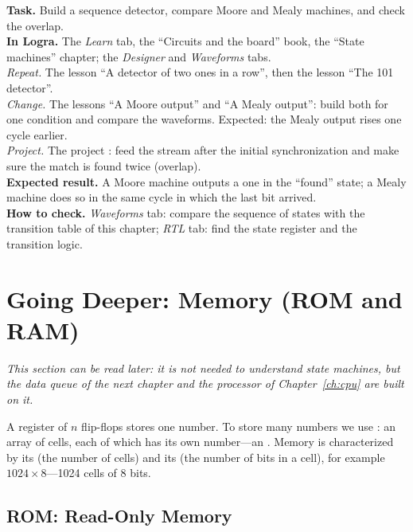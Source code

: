 \begin{diybox}
\textbf{Task.} Build a sequence detector, compare Moore and Mealy machines,
and check the overlap.\\
\textbf{In Logra.} The \emph{Learn} tab, the ``Circuits and the board'' book,
the ``State machines'' chapter; the \emph{Designer} and \emph{Waveforms}
tabs.\\
 \emph{Repeat.} The lesson ``A detector of two ones in a row'', then
the lesson ``The 101 detector''.\\
 \emph{Change.} The lessons ``A Moore output'' and ``A Mealy output'':
build both for one condition and compare the waveforms. Expected: the Mealy
output rises one cycle earlier.\\
 \emph{Project.} The project : feed the stream
 after the initial synchronization and make sure the match is
found twice (overlap).\\
\textbf{Expected result.} A Moore machine outputs a one in the ``found''
state; a Mealy machine does so in the same cycle in which the last bit arrived.\\
\textbf{How to check.} \emph{Waveforms} tab: compare the sequence of states with
the transition table of this chapter; \emph{RTL} tab: find the state register
and the transition logic.
\end{diybox}

\section{Going Deeper: Memory (ROM and RAM)}
\label{sec:memory}

\emph{This section can be read later: it is not needed to understand state
machines, but the data queue of the next chapter and the processor of Chapter~\ref{ch:cpu}
are built on it.}

A register of $n$ flip-flops stores one number. To store many numbers we use
: an array of cells, each of which has its own number---an
. Memory is characterized by its  (the number of
cells) and its  (the number of bits in a cell), for example
$1024 \times 8$---1024 cells of 8 bits.

\subsection{ROM: Read-Only Memory}

